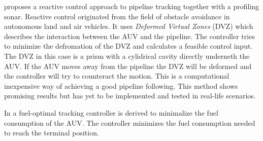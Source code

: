 	\cite{reactive_control_AUV} proposes a reactive control approach to pipeline tracking together with a profiling sonar. Reactive control originated from the field of obstacle avoidance in autonomous land and air vehicles. It uses \textit{Deformed Virtual Zones} (DVZ) which describes the interaction between the AUV and the pipeline. The controller tries to minimize the defromation of the DVZ and calculates a feasible control input. The DVZ in this case is a prism with a cylidrical cavity directly underneth the AUV. If the AUV moves away from the pipeline the DVZ will be deformed and the controller will try to counteract the motion. This is a computational inexpensive way of achieving a good pipeline following. This method shows promising results but has yet to be implemented and tested in real-life scenarios. 
	
	In \cite{fuel_optimal_control} a fuel-optimal tracking controller is derived to minimalize the fuel consumption of the AUV. The controller minimizes the fuel consumption needed to reach the terminal position. 
	
	

